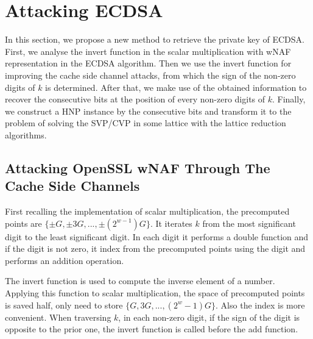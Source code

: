 \section{Attacking ECDSA}
\label{sec:attack}
In this section, we propose a new method to retrieve the private key of ECDSA.
First, we analyse the invert function in the scalar multiplication with wNAF representation in the ECDSA algorithm.
 Then we use the invert function for improving the cache side channel attacks, from which the sign of the non-zero digits of $k$ is determined.
After that, we make use of the obtained information to recover the consecutive bits at the position of every non-zero digits of $k$. 
Finally, we construct a HNP instance by the consecutive bits and transform it to the problem of solving the SVP/CVP in some lattice with the lattice reduction algorithms.
 
\subsection{Attacking OpenSSL wNAF Through The Cache Side Channels}
\label{data_get}
First recalling the implementation of scalar multiplication, the precomputed points are $\{\pm G, \pm 3G, ..., \pm(2^{w - 1})G\}$. It iterates $k$ from the most significant digit to the least significant digit.
In each digit it performs a double function and if the digit is not zero, it  index from the precomputed points using the digit and performs an addition operation.

The invert function is used to compute the inverse element of a number. 
Applying this function to scalar multiplication, the space of precomputed points is saved half, only need to store $\{G, 3G, ..., (2^{w} - 1)G\}$.
Also the index is more convenient. 
When traversing $k$, in each non-zero digit, if the sign of the digit is opposite to the prior one, the invert function is called before the add function. 

